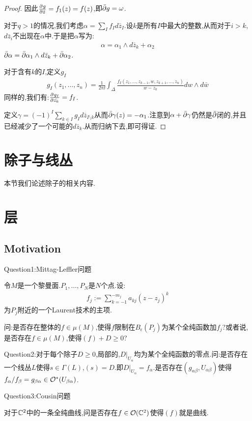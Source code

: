 \begin{proof}
	因此$\frac{\partial^{} g}{\partial {\bar{z}}^{}}=f_1(z)=f(z)$,即$\bar{\partial} g=\omega$.

	对于$q>1$的情况,我们考虑$\alpha=\sum_{I}f_Id\bar{z}_I$.设$k$是所有$I$中最大的整数,从而对于$i>k$,$d\bar{z}_i$不出现在$\alpha$中.于是把$\alpha$写为:
	\begin{align*}
		\alpha=\alpha_1 \wedge d\bar{z}_k+\alpha_2
	\end{align*}
	$\bar{\partial}\alpha=\bar{\partial} \alpha_1 \wedge d\bar{z}_k+\bar{\partial} \alpha_2$.

	对于含有$k$的$I$,定义$g_I$
	\begin{align*}
		g_I(z_1,\dots,z_n)=\frac{1}{2\pi \ii}\int_{\Delta}\frac{f_I(z_1,\dots,z_{k-1},w,z_{k+1},\dots,z_n)}{w-z_k}dw\wedge d\bar{w}
	\end{align*}
	同样的,我们有:$\frac{\partial^{} g_I}{\partial {\bar{z_k}}^{}}=f_I$.

	定义$\gamma=(-1)^I\sum_{k\in I}g_I d\bar{z}_{I\setminus k}$从而$\bar{\partial}\gamma(z)=-\alpha_1$.注意到$\alpha+\bar{\partial}{\gamma}$仍然是$\bar{\partial}$闭的,并且已经减少了一个可能的$d\bar{z}_k$.从而归纳下去,即可得证.
\end{proof}

\section{除子与线丛}
本节我们论述除子的相关内容.
\section{层}
\subsection*{Motivation}
Question1:Mittag-Leffler问题

令$M$是一个黎曼面.$P_1,\dots,P_N$是$N$个点.设:
\begin{align*}
	f_j:=\sum_{k=-1}^{-m_j}a_{kj}(z-z_j)^k
\end{align*}
为$P_j$附近的一个Laurent技术的主项.

问:是否存在整体的$f\in \mu(M)$,使得$f$限制在$B_{\epsilon}(P_j)$为某个全纯函数加$f_j$?或者说,是否存在$f\in \mu(M)$,使得$(f)+D\geq 0$?


Question2:对于每个除子$D\geq 0$,局部的,$D|_{U_\alpha}$均为某个全纯函数的零点.问:是否存在一个线丛$L$使得$s\in \Gamma(L)$,$(s)=D$.即$D|_{U_\alpha}=f_{\alpha}$.是否存在$(g_{\alpha\beta},U_{\alpha\beta})$使得$f_\alpha/f_\beta=g_{\beta\alpha}\in \mathcal{O}^*(U_{\beta\alpha})$.

Question3:Cousin问题

对于$\mathbb{C}^2$中的一条全纯曲线,问是否存在$f \in \mathcal{O}(\mathbb{C}^2)$使得$(f)$就是曲线.

